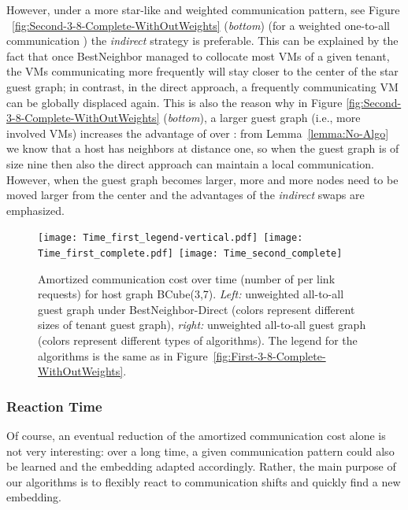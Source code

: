\documentclass[conference]{IEEEtran}
\def\BC#1#2{BCube(#1,#2)}
\newcommand{\BestNeighborD}{{\sc BestNeighbor-Direct} }
\begin{document}
However, under a more star-like and weighted communication pattern, see Figure ~\ref{fig:Second-3-8-Complete-WithOutWeights} (\emph{bottom}) (for a weighted one-to-all communication )
the \emph{indirect} strategy is preferable. This can be explained by the fact that once {\sc BestNeighbor} managed to collocate most VMs of a given tenant,
the VMs communicating more frequently will stay closer to the center of the star guest graph; in contrast, in the direct approach, a frequently communicating
VM can be globally displaced again. This is also the reason why in Figure \ref{fig:Second-3-8-Complete-WithOutWeights} (\emph{bottom}), a larger guest graph (i.e., more involved VMs) increases the advantage of  over : from Lemma~\ref{lemma:No-Algo} we know that a host  has   neighbors at distance one, so when the guest graph is of size nine then also the direct approach can maintain a local communication.
However, when the guest graph becomes larger, more and more nodes need to be moved larger from the center and the advantages of the \emph{indirect} swaps are emphasized.

				


				





\begin{figure}[h]
				\centering
				 \texttt{[image: Time\_first\_legend-vertical.pdf]}~\texttt{[image: Time\_first\_complete.pdf]}~\texttt{[image: Time\_second\_complete]}\\
				\caption{Amortized communication cost over time (number of per link requests) for host graph \BC{3}{7}. \emph{Left:} unweighted all-to-all guest graph  under \BestNeighborD (colors represent different sizes of tenant guest graph), \emph{right:} unweighted all-to-all guest graph  (colors represent different types of algorithms). The legend for the algorithms is the same as in Figure~\ref{fig:First-3-8-Complete-WithOutWeights}.}
				\label{fig:Time_first_complete}
				\end{figure}



\subsubsection{Reaction Time}
Of course, an eventual reduction of the amortized communication cost alone is not very interesting: over a long time,
a given communication pattern could also be learned and the embedding adapted accordingly. Rather, the main purpose
of our algorithms is to flexibly react to communication shifts and quickly find a new embedding.
\end{document}

